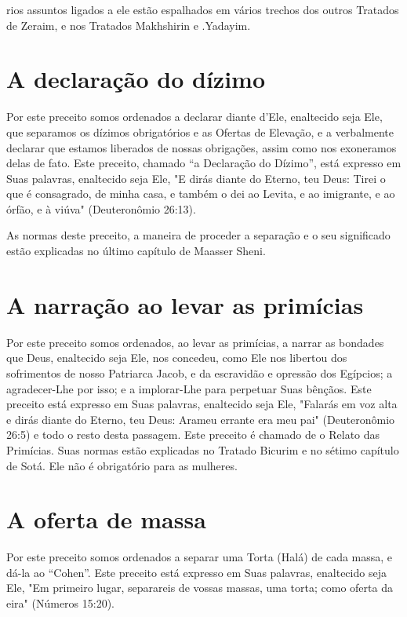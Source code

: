 rios assuntos ligados a ele estão espalhados em vários trechos dos
outros Trata­dos de Zeraim, e nos Tratados Makhshirin e .Yadayim.

\section{A declaração do dízimo}

Por este preceito somos ordenados a declarar diante d'Ele, enalteci­do
seja Ele, que separamos os dízimos obrigatórios e as Ofertas de
Elevação, e a verbalmente declarar que estamos liberados de nossas
obrigações, assim co­mo nos exoneramos delas de fato. Este preceito,
chamado ``a Declaração do Dízimo'', está expresso em Suas palavras,
enaltecido seja Ele, "E dirás diante do Eterno, teu Deus: Tirei o que é
consagrado, de minha casa, e também o dei ao Levita, e ao imigrante, e
ao órfão, e à viúva" (Deuteronômio 26:13).

As normas deste preceito, a maneira de proceder a separação e o seu
significado estão explicadas no último capítulo de Maasser Sheni.

\section{A narração ao levar as primícias}

Por este preceito somos ordenados, ao levar as primícias, a narrar as
bondades que Deus, enaltecido seja Ele, nos concedeu, como Ele nos
liber­tou dos sofrimentos de nosso Patriarca Jacob, e da escravidão e
opressão dos Egípcios; a agradecer-Lhe por isso; e a implorar-Lhe para
perpetuar Suas bên­çãos. Este preceito está expresso em Suas palavras,
enaltecido seja Ele, "Falarás em voz alta e dirás diante do Eterno, teu
Deus: Arameu errante era meu pai" (Deuteronômio 26:5) e todo o resto
desta passagem. Este preceito é chamado de o Relato das Primícias. Suas
normas estão explicadas no Tratado Bicurim e no sétimo capítulo de Sotá.
Ele não é obrigatório para as mulheres.

\section{A oferta de massa}

Por este preceito somos ordenados a separar uma Torta (Halá) de ca­da
massa, e dá-la ao ``Cohen''. Este preceito está expresso em Suas palavras,
enaltecido seja Ele, "Em primeiro lugar, separareis de vossas massas,
uma torta; como oferta da eira" (Números 15:20).

